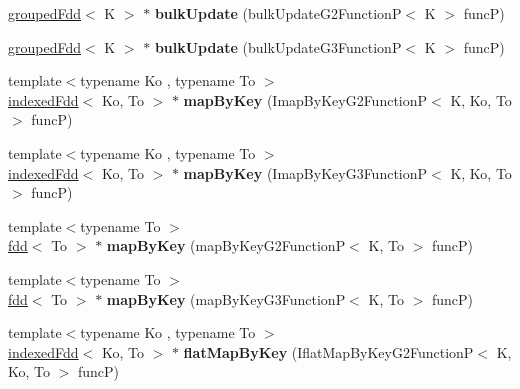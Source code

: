 \begin{DoxyCompactItemize}
\hyperlink{classfaster_1_1groupedFdd}{grouped\+Fdd}$<$ K $>$ $\ast$ {\bfseries bulk\+Update} (bulk\+Update\+G2\+FunctionP$<$ K $>$ funcP)
\item 
\hypertarget{classfaster_1_1groupedFdd_a94e31fcb308364979d63dd508a689121}{}\label{classfaster_1_1groupedFdd_a94e31fcb308364979d63dd508a689121} 
\hyperlink{classfaster_1_1groupedFdd}{grouped\+Fdd}$<$ K $>$ $\ast$ {\bfseries bulk\+Update} (bulk\+Update\+G3\+FunctionP$<$ K $>$ funcP)
\item 
\hypertarget{classfaster_1_1groupedFdd_a8cb1ae5d826c3d627b2585427d39da71}{}\label{classfaster_1_1groupedFdd_a8cb1ae5d826c3d627b2585427d39da71} 
{\footnotesize template$<$typename Ko , typename To $>$ }\\\hyperlink{classfaster_1_1indexedFdd}{indexed\+Fdd}$<$ Ko, To $>$ $\ast$ {\bfseries map\+By\+Key} (Imap\+By\+Key\+G2\+FunctionP$<$ K, Ko, To $>$ funcP)
\item 
\hypertarget{classfaster_1_1groupedFdd_ab1b385fdc95450d7a07418b05ca3c404}{}\label{classfaster_1_1groupedFdd_ab1b385fdc95450d7a07418b05ca3c404} 
{\footnotesize template$<$typename Ko , typename To $>$ }\\\hyperlink{classfaster_1_1indexedFdd}{indexed\+Fdd}$<$ Ko, To $>$ $\ast$ {\bfseries map\+By\+Key} (Imap\+By\+Key\+G3\+FunctionP$<$ K, Ko, To $>$ funcP)
\item 
\hypertarget{classfaster_1_1groupedFdd_a8a2e1ce009a5d701d7f27d9821ae0770}{}\label{classfaster_1_1groupedFdd_a8a2e1ce009a5d701d7f27d9821ae0770} 
{\footnotesize template$<$typename To $>$ }\\\hyperlink{classfaster_1_1fdd}{fdd}$<$ To $>$ $\ast$ {\bfseries map\+By\+Key} (map\+By\+Key\+G2\+FunctionP$<$ K, To $>$ funcP)
\item 
\hypertarget{classfaster_1_1groupedFdd_a571d54ed407c328526e7c67cd7be991d}{}\label{classfaster_1_1groupedFdd_a571d54ed407c328526e7c67cd7be991d} 
{\footnotesize template$<$typename To $>$ }\\\hyperlink{classfaster_1_1fdd}{fdd}$<$ To $>$ $\ast$ {\bfseries map\+By\+Key} (map\+By\+Key\+G3\+FunctionP$<$ K, To $>$ funcP)
\item 
\hypertarget{classfaster_1_1groupedFdd_a7189b8f22a6b6aa82d826242e0c085e2}{}\label{classfaster_1_1groupedFdd_a7189b8f22a6b6aa82d826242e0c085e2} 
{\footnotesize template$<$typename Ko , typename To $>$ }\\\hyperlink{classfaster_1_1indexedFdd}{indexed\+Fdd}$<$ Ko, To $>$ $\ast$ {\bfseries flat\+Map\+By\+Key} (Iflat\+Map\+By\+Key\+G2\+FunctionP$<$ K, Ko, To $>$ funcP)

\end{DoxyCompactItemize}
